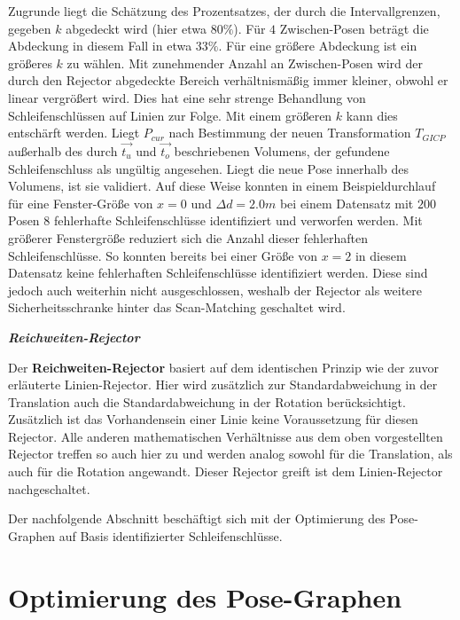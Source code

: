 Zugrunde liegt die Schätzung des Prozentsatzes, der durch die Intervallgrenzen, gegeben $k$ abgedeckt wird (hier etwa $80\%$). Für $4$ Zwischen-Posen beträgt die Abdeckung in diesem Fall in etwa $33\%$. Für eine größere Abdeckung ist ein größeres $k$ zu wählen. Mit zunehmender Anzahl an Zwischen-Posen wird der durch den Rejector abgedeckte Bereich verhältnismäßig immer kleiner, obwohl er linear vergrößert wird. Dies hat eine sehr strenge Behandlung von Schleifenschlüssen auf Linien zur Folge. Mit einem größeren $k$ kann dies entschärft werden. Liegt $P_{cur}$ nach Bestimmung der neuen Transformation $T_{GICP}$ außerhalb des durch $\vec{t_u}$ und $\vec{t_o}$ beschriebenen Volumens, der gefundene Schleifenschluss als ungültig angesehen. Liegt die neue Pose innerhalb des Volumens, ist sie validiert. Auf diese Weise konnten in einem Beispieldurchlauf für eine Fenster-Größe von $x = 0$ und $\Delta d = 2.0m$ bei einem Datensatz mit $200$ Posen $8$ fehlerhafte Schleifenschlüsse identifiziert und verworfen werden. Mit größerer Fenstergröße reduziert sich die Anzahl dieser fehlerhaften Schleifenschlüsse. So konnten bereits bei einer Größe von $x = 2$ in diesem Datensatz keine fehlerhaften Schleifenschlüsse identifiziert werden. Diese sind jedoch auch weiterhin nicht ausgeschlossen, weshalb der Rejector als weitere Sicherheitsschranke hinter das Scan-Matching geschaltet wird.

\textbf{\textsl{Reichweiten-Rejector}}

Der \textbf{Reichweiten-Rejector} basiert auf dem identischen Prinzip wie der zuvor erläuterte Linien-Rejector. Hier wird zusätzlich zur Standardabweichung in der Translation auch die Standardabweichung in der Rotation berücksichtigt. Zusätzlich ist das Vorhandensein einer Linie keine Voraussetzung für diesen Rejector. Alle anderen mathematischen Verhältnisse aus dem oben vorgestellten Rejector treffen so auch hier zu und werden analog sowohl für die Translation, als auch für die Rotation angewandt.  Dieser Rejector greift ist dem Linien-Rejector nachgeschaltet.

Der nachfolgende Abschnitt beschäftigt sich mit der Optimierung des Pose-Graphen auf Basis identifizierter Schleifenschlüsse.

\section{Optimierung des Pose-Graphen}

